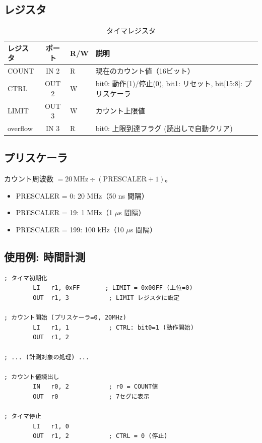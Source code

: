 \documentclass[a4paper,11pt]{ltjsarticle}
\begin{document}
\subsection{レジスタ}

\begin{table}[h]
\centering
\caption{タイマレジスタ}
\begin{tabular}{lclp{6cm}}
\toprule
レジスタ & ポート & R/W & 説明 \\
\midrule
COUNT    & IN 2  & R & 現在のカウント値（16ビット） \\
CTRL     & OUT 2 & W & bit0: 動作(1)/停止(0), bit1: リセット, bit[15:8]: プリスケーラ \\
LIMIT    & OUT 3 & W & カウント上限値 \\
overflow & IN 3  & R & bit0: 上限到達フラグ (読出しで自動クリア) \\
\bottomrule
\end{tabular}
\end{table}

\subsection{プリスケーラ}

カウント周波数 $= 20\,\mathrm{MHz} \div (\mathrm{PRESCALER} + 1)$。

\begin{itemize}
\item PRESCALER = 0: 20 MHz（50 ns 間隔）
\item PRESCALER = 19: 1 MHz（1 $\mu$s 間隔）
\item PRESCALER = 199: 100 kHz（10 $\mu$s 間隔）
\end{itemize}

\subsection{使用例: 時間計測}

\begin{lstlisting}[language={},caption={タイマによる実行時間計測}]
; タイマ初期化
        LI   r1, 0xFF       ; LIMIT = 0x00FF (上位=0)
        OUT  r1, 3           ; LIMIT レジスタに設定

; カウント開始 (プリスケーラ=0, 20MHz)
        LI   r1, 1           ; CTRL: bit0=1 (動作開始)
        OUT  r1, 2

; ... (計測対象の処理) ...

; カウント値読出し
        IN   r0, 2           ; r0 = COUNT値
        OUT  r0              ; 7セグに表示

; タイマ停止
        LI   r1, 0
        OUT  r1, 2           ; CTRL = 0 (停止)
\end{lstlisting}
\end{document}
